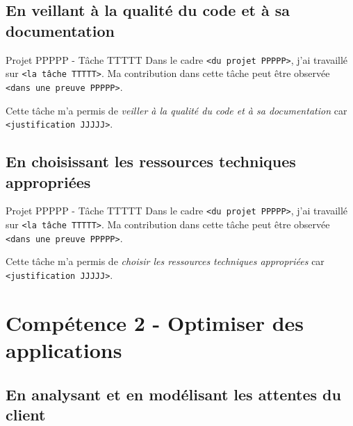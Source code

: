 \documentclass[%
    10pt,%
    usenames,%
    dvipsnames%
]{beamer}
\begin{document}
\subsection{En veillant à la qualité du code et à sa
documentation}\label{en-veillant-uxe0-la-qualituxe9-du-code-et-uxe0-sa-documentation}

\begin{frame}[fragile]{Projet PPPPP - Tâche TTTTT}
\label{projet-ppppp---tuxe2che-ttttt-2}
Dans le cadre \texttt{\textless{}du\ projet\ PPPPP\textgreater{}}, j'ai
travaillé sur \texttt{\textless{}la\ tâche\ TTTTT\textgreater{}}. Ma
contribution dans cette tâche peut être observée
\texttt{\textless{}dans\ une\ preuve\ PPPPP\textgreater{}}.

Cette tâche m'a permis de \emph{veiller à la qualité du code et à sa
documentation} car
\texttt{\textless{}justification\ JJJJJ\textgreater{}}.
\end{frame}

\subsection{En choisissant les ressources techniques
appropriées}\label{en-choisissant-les-ressources-techniques-appropriuxe9es}

\begin{frame}[fragile]{Projet PPPPP - Tâche TTTTT}
\label{projet-ppppp---tuxe2che-ttttt-3}
Dans le cadre \texttt{\textless{}du\ projet\ PPPPP\textgreater{}}, j'ai
travaillé sur \texttt{\textless{}la\ tâche\ TTTTT\textgreater{}}. Ma
contribution dans cette tâche peut être observée
\texttt{\textless{}dans\ une\ preuve\ PPPPP\textgreater{}}.

Cette tâche m'a permis de \emph{choisir les ressources techniques
appropriées} car \texttt{\textless{}justification\ JJJJJ\textgreater{}}.
\end{frame}

\section{Compétence 2 - Optimiser des
applications}\label{compuxe9tence-2---optimiser-des-applications}

\subsection{En analysant et en modélisant les attentes du
client}\label{en-analysant-et-en-moduxe9lisant-les-attentes-du-client}
\end{document}
